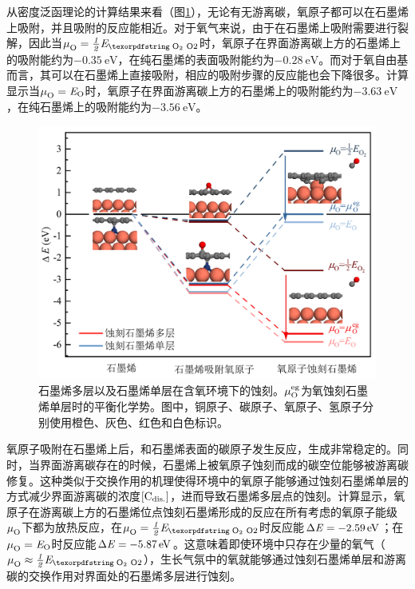 从密度泛函理论的计算结果来看（图\ref{fig:FLG_DFT_Oetch}），无论有无游离碳，氧原子都可以在石墨烯上吸附，并且吸附的反应能相近。对于氧气来说，由于在石墨烯上吸附需要进行裂解，因此当$\muO{}=\halfEOm$时，氧原子在界面游离碳上方的石墨烯上的吸附能约为$\SI{-0.35}{\electronvolt}$，在纯石墨烯的表面吸附能约为$\SI{-0.28}{\electronvolt}$。而对于氧自由基而言，其可以在石墨烯上直接吸附，相应的吸附步骤的反应能也会下降很多。计算显示当$\it \mu_{\rm O}^{\rm } \it=\it E_{\rm O} \it$时，氧原子在界面游离碳上方的石墨烯上的吸附能约为$\SI{-3.63}{\electronvolt}$，在纯石墨烯上的吸附能约为$\SI{-3.56}{\electronvolt}$。

\begin{figure}[htb]
    \includegraphics{pic/FLG_DFT_Oetch.png}
    \caption{
        石墨烯多层以及石墨烯单层在含氧环境下的蚀刻。$\it \mu_{\rm O}^{\rm eg} \it$为氧蚀刻石墨烯单层时的平衡化学势。图中，铜原子、碳原子、氧原子、氢原子分别使用橙色、灰色、红色和白色标识。
    }
    \label{fig:FLG_DFT_Oetch}
\end{figure}

氧原子吸附在石墨烯上后，和石墨烯表面的碳原子发生反应，生成非常稳定的。同时，当界面游离碳存在的时候，石墨烯上被氧原子蚀刻而成的碳空位能够被游离碳修复。这种类似于交换作用的机理使得环境中的氧原子能够通过蚀刻石墨烯单层的方式减少界面游离碳的浓度$\rm{\left[C_{dis.}\right]} \it$，进而导致石墨烯多层点的蚀刻。计算显示，氧原子在游离碳上方的石墨烯位点蚀刻石墨烯形成的反应在所有考虑的氧原子能级$\it \mu_{\rm O}^{\rm } \it$下都为放热反应，在$\muO{}=\halfEOm$时反应能$\rm{\Delta} \it E=\SI{-2.59}{\electronvolt}$；在$\it \mu_{\rm O}^{\rm } \it=\it E_{\rm O} \it$时反应能$\rm{\Delta} \it E=\SI{-5.87}{\electronvolt}$。这意味着即使环境中只存在少量的氧气（$\muO{} \approx \halfEOm$），生长气氛中的氧就能够通过蚀刻石墨烯单层和游离碳的交换作用对界面处的石墨烯多层进行蚀刻。

